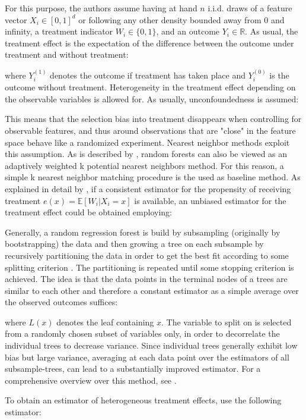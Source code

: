 \documentclass[11pt, a4paper, leqno]{article}
\begin{document}
For this purpose, the authors assume having at hand \(n\) i.i.d. draws of a feature vector \(X_i \in [0,1]^d\) or following any other density bounded away from 0 and infinity, a treatment indicator \(W_i \in \{0,1\}\), and an outcome \(Y_i \in \mathbb{R}\).
As usual, the treatment effect is the expectation of the difference between the outcome under treatment and without treatment:

where \(Y_i^{(1)}\) denotes the outcome if treatment has taken place and \(Y_i^{(0)}\) is the outcome without treatment. Heterogeneity in the treatment effect depending on the observable variables is allowed for. 
As usually, unconfoundedness is assumed:

This means that the selection bias into treatment disappears when controlling for observable features, and thus around observations that are "close" in the feature space behave like a randomized experiment. 
Nearest neighbor methods exploit this assumption. As is described by \citet{lj06}, random forests can also be viewed as an adaptively weighted k potential nearest neighbors method. For this reason, a simple k nearest neighbor matching procedure is the used as baseline method.
As explained in detail by \citet{hir03}, if a consistent estimator for the propensity of receiving treatment \(e(x) = \mathbb{E}[W_i|X_i = x]\)  is available, an unbiased estimator for the treatment effect could be obtained employing: 


Generally, a random regression forest is build by subsampling (originally by bootstrapping) the data and then growing a tree on each subsample by recursively partitioning the data in order to get the best fit according to some splitting criterion \citep[p.~304 ff.]{htf08}. The partitioning is repeated until some stopping criterion is achieved. The idea is that the data points in the terminal nodes of a trees are similar to each other and therefore a constant estimator as a simple average over the observed outcomes suffices:

where \(L(x)\) denotes the leaf containing \(x\).
The variable to split on is selected from a randomly chosen subset of variables only, in order to decorrelate the individual trees to decrease variance. Since individual trees generally exhibit low bias but large variance, averaging at each data point over the estimators of all subsample-trees, can lead to a substantially improved estimator. 
For a comprehensive overview over this method, see \cite[p.~587 ff.]{htf08}.

To obtain an estimator of heterogeneous treatment effects, \cite{wa18} use the following estimator:

\end{document}
